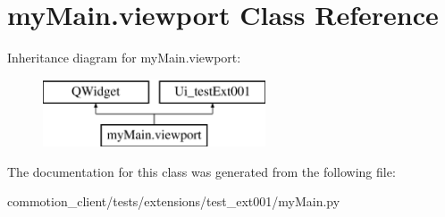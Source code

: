 \hypertarget{classmyMain_1_1viewport}{\section{my\+Main.\+viewport Class Reference}
\label{classmyMain_1_1viewport}
}
Inheritance diagram for my\+Main.\+viewport\+:\begin{figure}[H]
\begin{center}
\leavevmode
\includegraphics[height=2.000000cm]{classmyMain_1_1viewport}
\end{center}
\end{figure}


The documentation for this class was generated from the following file\+:\begin{DoxyCompactItemize}
\item 
commotion\+\_\+client/tests/extensions/test\+\_\+ext001/my\+Main.\+py\end{DoxyCompactItemize}
